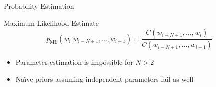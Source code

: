 \documentclass[department=cls, notes={hide notes}, official=true]{beamerruhuisstijl}
\begin{document}
\begin{frame}{Probability Estimation}
	\begin{block}{Maximum Likelihood Estimate}
    	\[ p_{\text{ML}}(w_i | w_{i-N+1},\ldots,w_{i-1}) = \frac{C(w_{i-N+1},\ldots,w_{i})}{C(w_{i-N+1},\ldots,w_{i-1})} \]
        \begin{itemize}
        \item Parameter estimation is impossible for $N>2$
        \item Na\"ive priors assuming independent parameters fail as well
        \end{itemize}
    \end{block}
    
\end{frame}
\end{document}
